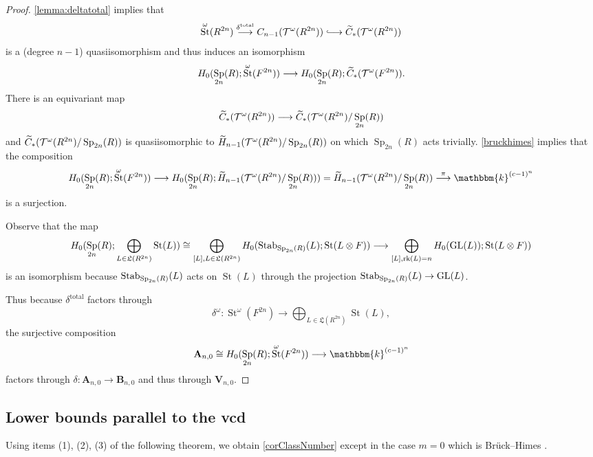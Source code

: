 \documentclass[11pt,letterpaper]{amsart}
\newcommand{\bk}{\mathbbm{k}}
\DeclareMathOperator{\Sp}{Sp}
\newcommand{\VV}{\mathbf{V}}
\newcommand{\HH}{\mathbf{B}}
\newcommand{\HA}{\mathbf{A}}
\newcommand{\hooklongrightarrow}{\lhook\joinrel\longrightarrow}
\newcommand{\fL}{\mathfrak{L}}
\numberwithin{theoremcounter}{section}
\theoremstyle{definition}
\theoremstyle{remark}
\newcommand{\mr}[1]{{\rm #1}}
\newcommand{\Stab}{\mr{Stab}}
\DeclareMathOperator{\rk}{rk}
\DeclareMathOperator{\GL}{GL}
\DeclareMathOperator{\St}{St}
\begin{document}
\begin{proof} %
   \autoref{lemma:deltatotal} implies that  %
    \[\St^\omega(R^{2n})  \stackrel{\delta^{\mathrm{total}}}{\longrightarrow} C_{n-1}(\cT^\omega(R^{2n})) \hooklongrightarrow \widetilde C_*(\cT^\omega(R^{2n}))\] 
    is a (degree $n-1$) quasiisomorphism and thus induces an isomorphism
    \[ H_0(\Sp_{2n}(R);\St^\omega(F^{2n})) \longrightarrow H_0(\Sp_{2n}(R);\widetilde C_*(\cT^\omega(F^{2n})).\]
    There is an equivariant map 
    \[\widetilde C_*(\cT^\omega(R^{2n})) \longrightarrow \widetilde C_*(\cT^\omega(R^{2n})/\Sp_{2n}(R))\]
    and $\widetilde C_*(\cT^\omega(R^{2n})/\Sp_{2n}(R))$ is quasiisomorphic to $\widetilde H_{n-1}(\cT^\omega(R^{2n})/\Sp_{2n}(R))$ on which $\Sp_{2n}(R)$ acts trivially. \autoref{bruckhimes} implies that the composition
    \[ H_0(\Sp_{2n}(R);\St^\omega(F^{2n})) \longrightarrow H_0(\Sp_{2n}(R);\widetilde H_{n-1}(\cT^\omega(R^{2n})/\Sp_{2n}(R))) = \widetilde H_{n-1}(\cT^\omega(R^{2n})/\Sp_{2n}(R)) \stackrel{\pi}{\longrightarrow}\bk^{(c-1)^n} \]
    is a surjection.

    Observe that the map
    \[ H_0(\Sp_{2n}(R); \bigoplus_{L\in \fL(R^{2n})} \St(L)) \cong \bigoplus_{[L], L\in \fL(R^{2n})} H_0(\Stab_{\Sp_{2n}(R)}(L);\St(L \otimes F)) \longrightarrow \bigoplus_{[L], \rk(L) = n}H_0(\GL(L));\St(L \otimes F)) \]
    is an isomorphism because $\Stab_{\Sp_{2n}(R)}(L)$ acts on $\St(L)$ through the projection $\Stab_{\Sp_{2n}(R)}(L) \to \GL(L)$.

    Thus because $\delta^{\mathrm{total}}$ factors through
    \[ \delta^\omega\colon \St^\omega(F^{2n}) \longrightarrow \bigoplus_{L\in \fL(R^{2n})} \St(L),\]
    the surjective composition
    \[ \HA_{n,0} \cong H_0(\Sp_{2n}(R);\St^\omega(F^{2n})) \longrightarrow \bk^{(c-1)^n} \]
    factors through $\delta\colon \HA_{n,0} \to\HH_{n,0}$ and thus through $\VV_{n,0}$.
\end{proof}
 
\subsection{Lower bounds parallel to the vcd}

Using items (1), (2), (3) of the following theorem, we obtain \autoref{corClassNumber} except in the case $m=0$ which is Br\"uck--Himes \cite[Theorem 1.1]{BH}. 
\end{document}
